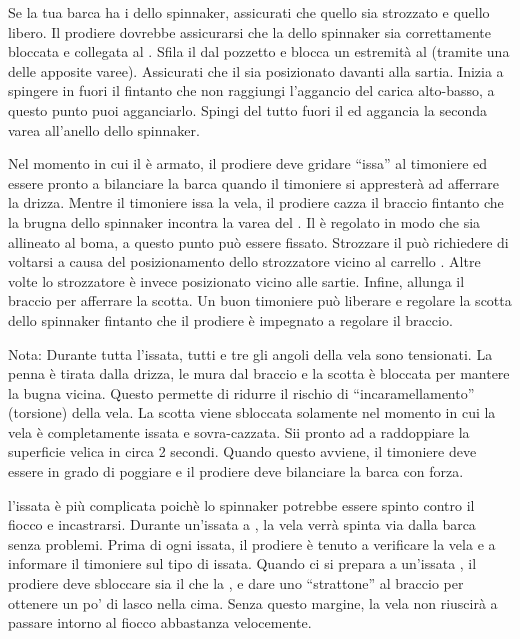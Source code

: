 Se la tua barca ha i \twinglines dello spinnaker, assicurati che quello
\windward sia strozzato e quello \leeward libero. Il prodiere dovrebbe
assicurarsi che la \sheet dello spinnaker sia correttamente bloccata e collegata
al \guy. Sfila il \pole dal pozzetto e blocca un estremità al \guy (tramite una
delle apposite varee). Assicurati che il \pole sia posizionato davanti alla
sartia. Inizia a spingere in fuori il \pole fintanto che non raggiungi
l'aggancio del carica alto-basso, a questo punto puoi agganciarlo. Spingi del
tutto fuori il \pole ed aggancia la seconda varea all'anello dello spinnaker.

Nel momento in cui il \pole è armato, il prodiere deve gridare ``issa'' al
timoniere ed essere pronto a bilanciare la barca quando il timoniere si
appresterà ad afferrare la drizza. Mentre il timoniere issa la vela, il
prodiere cazza il braccio fintanto che la brugna dello spinnaker incontra la
varea del \pole. Il \pole è regolato in modo che sia allineato al boma, a questo
punto può essere fissato. Strozzare il \guy può richiedere di voltarsi a causa
del posizionamento dello strozzatore vicino al carrello . Altre volte lo
strozzatore è invece posizionato vicino alle sartie. Infine, allunga il braccio
per afferrare la scotta. Un buon timoniere può liberare e regolare la scotta
dello spinnaker fintanto che il prodiere è impegnato a regolare il braccio.

Nota: Durante tutta l'issata, tutti e tre gli angoli della vela sono tensionati.
La penna è tirata dalla drizza, le mura dal braccio e la scotta è bloccata per
mantere la bugna vicina. Questo permette di ridurre il rischio di
``incaramellamento'' (torsione) della vela. La scotta viene sbloccata solamente
nel momento in cui la vela è completamente issata e sovra-cazzata. Sii pronto ad
a raddoppiare la superficie velica in circa 2 secondi. Quando questo avviene, il
timoniere deve essere in grado di poggiare e il prodiere deve bilanciare la
barca con forza.

l'issata \windward è più complicata poichè lo spinnaker potrebbe essere spinto
contro il fiocco e incastrarsi. Durante un'issata a \leeward, la vela verrà
spinta via dalla barca senza problemi. Prima di ogni issata, il prodiere è
tenuto a verificare la vela e a informare il timoniere sul tipo di issata.
Quando ci si prepara a un'issata \windward, il prodiere deve sbloccare sia il
\guy che la \sheet, e dare uno ``strattone'' al braccio per ottenere un po' di
lasco nella cima. Senza questo margine, la vela non riuscirà a passare intorno
al fiocco abbastanza velocemente.

